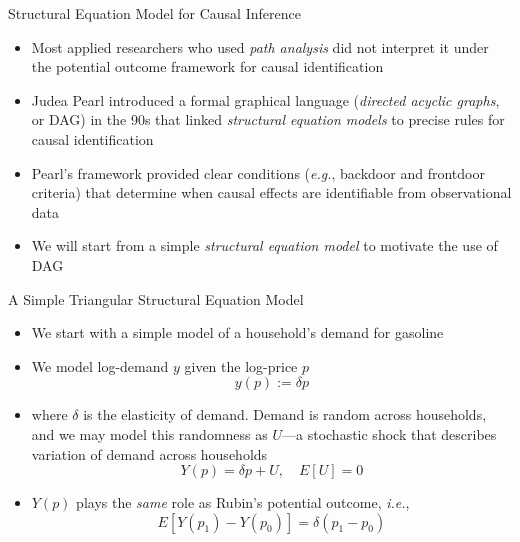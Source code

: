 \documentclass[aspectratio=1610,12pt,xcolor=dvipsnames]{beamer}
\begin{document}
\begin{frame}{Structural Equation Model for Causal Inference}

\begin{itemize}
    \item Most applied researchers who used \textit{path analysis} did not interpret it under the potential outcome framework for causal identification
    \item Judea Pearl introduced a formal graphical language (\textit{directed acyclic graphs}, or DAG) in the 90s that linked \textit{structural equation models} to precise rules for causal identification
    \item Pearl’s framework provided clear conditions (\textit{e.g.}, backdoor and frontdoor criteria) that determine when causal effects are identifiable from observational data
    \item We will start from a simple \textit{structural equation model} to motivate the use of DAG
\end{itemize}
\end{frame}

\begin{frame}{A Simple Triangular Structural Equation Model}

\begin{itemize}
    \item We start with a simple model of a household's demand for gasoline
    \item We model log-demand $y$ given the log-price $p$
    \[y(p) := \delta p\]
    \item where $\delta$ is the elasticity of demand. Demand is random across households, and we may model this randomness as $U$—a stochastic shock that describes variation of demand across households
    \[Y(p) = \delta p + U, \quad E[U] = 0\]
    \item $Y(p)$ plays the \textit{same} role as Rubin's potential outcome, \textit{i.e.},
    \[E[Y(p_1) - Y(p_0)] = \delta(p_1 - p_0)\]
\end{itemize}
    
\end{frame}
\end{document}
